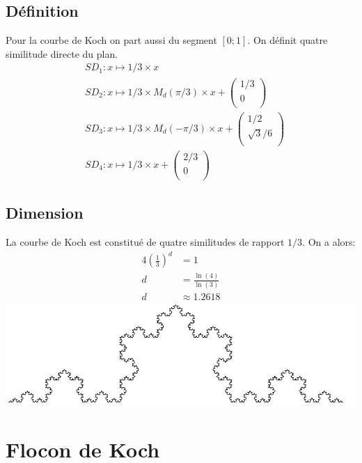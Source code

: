 \documentclass[a4paper, 12pt]{report}
\begin{document}
			\subsection{Définition}
				Pour la courbe de Koch on part aussi du segment $[0;1]$. On définit quatre similitude directe du plan.
				\begin{align*}
					&SD_1:x\mapsto 1/3\times x\\
					&SD_2:x\mapsto 1/3\times M_d(\pi/3)\times x+\left(	\begin{array}{ccc}
															1/3\\
															0\\
														\end{array}\right)\\
					&SD_3:x\mapsto 1/3\times M_d(-\pi/3)\times x+\left(	\begin{array}{ccc}
															1/2\\
															\sqrt{3}/6\\
														\end{array}\right)\\
					&SD_4:x\mapsto 1/3\times x+\left(	\begin{array}{ccc}
															2/3\\
															0\\
														\end{array}\right)
				\end{align*}
			\subsection{Dimension}
				La courbe de Koch est constitué de quatre similitudes de rapport $1/3$. On a alors:
				\begin{align*}
					 4\left(\frac{1}{3}\right)^d	&=1\\
												d	&=\frac{\ln(4)}{\ln(3)}\\
												d	&\approx 1.2618
				\end{align*}
				\includegraphics[scale=0.9]{Images/courbe}
			
		\newpage
		\section{Flocon de Koch} 
\end{document}
